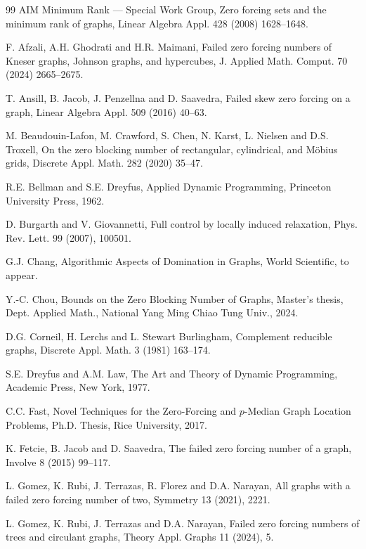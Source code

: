 \documentclass[preprint,12pt]{elsarticle}
\begin{document}
{\begin{thebibliography}{99}
AIM Minimum Rank --- Special Work Group,
Zero forcing sets and the minimum rank of graphs,
Linear Algebra Appl. 428 (2008) 1628--1648.

F. Afzali, A.H. Ghodrati and H.R. Maimani,
Failed zero forcing numbers of Kneser graphs, Johnson graphs, and hypercubes,
J. Applied Math. Comput. 70 (2024) 2665--2675.

T. Ansill, B. Jacob, J. Penzellna and D. Saavedra,
Failed skew zero forcing on a graph,
Linear Algebra Appl. 509 (2016) 40--63.

M. Beaudouin-Lafon, M. Crawford, S. Chen, N. Karst, L. Nielsen and D.S. Troxell,
On the zero blocking number of rectangular, cylindrical, and M\"obius grids,
Discrete Appl. Math. 282 (2020) 35--47.

R.E. Bellman and S.E. Dreyfus,
Applied Dynamic Programming,
Princeton University Press, 1962.

D. Burgarth and V. Giovannetti,
Full control by locally induced relaxation,
Phys. Rev. Lett. 99 (2007), 100501.

G.J. Chang,
Algorithmic Aspects of Domination in Graphs,
World Scientific, to appear.

Y.-C. Chou,
Bounds on the Zero Blocking Number of Graphs,
Master's thesis, Dept. Applied Math., National Yang Ming Chiao Tung Univ., 2024.

D.G. Corneil, H. Lerchs and L. Stewart Burlingham,
Complement reducible graphs,
Discrete Appl. Math. 3 (1981) 163--174.

S.E. Dreyfus and A.M. Law,
The Art and Theory of Dynamic Programming,
Academic Press, New York, 1977.

C.C. Fast,
Novel Techniques for the Zero-Forcing and $p$-Median Graph Location Problems,
Ph.D. Thesis, Rice University, 2017.

K. Fetcie, B. Jacob and D. Saavedra,
The failed zero forcing number of a graph,
Involve 8 (2015) 99--117.

L. Gomez, K. Rubi, J. Terrazas, R. Florez and D.A. Narayan,
All graphs with a failed zero forcing number of two,
Symmetry 13 (2021), 2221.

L. Gomez, K. Rubi, J. Terrazas and D.A. Narayan,
Failed zero forcing numbers of trees and circulant graphs,
Theory Appl. Graphs 11 (2024), 5.


\end{thebibliography}}
\end{document}
